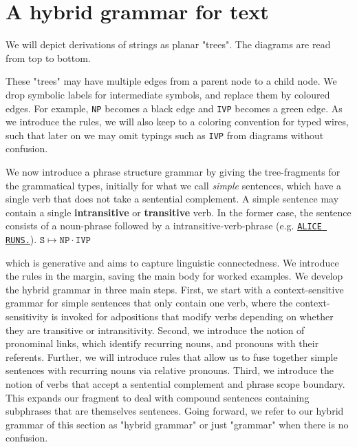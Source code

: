 \section{A hybrid grammar for text}\label{sec:grammar}

\begin{marginfigure}
\centering
{}
\caption{We will depict derivations of strings as planar "trees". The diagrams are read from top to bottom.}
\end{marginfigure}

\begin{marginfigure}
\centering
{}
\caption{These "trees" may have multiple edges from a parent node to a child node. We drop symbolic labels for intermediate symbols, and replace them by coloured edges. For example, \texttt{NP} becomes a black edge and \texttt{IVP} becomes a green edge. As we introduce the rules, we will also keep to a coloring convention for typed wires, such that later on we may omit typings such as \texttt{IVP} from diagrams without confusion.}
\end{marginfigure}

\begin{marginfigure}
\centering
{}
\caption{We now introduce a phrase structure grammar by giving the tree-fragments for the grammatical types, initially for what we call \emph{simple} sentences, which have a single verb that does not take a sentential complement. A simple sentence may contain a single \textbf{intransitive} or \textbf{transitive} verb. In the former case, the sentence consists of a noun-phrase followed by a intransitive-verb-phrase (e.g. \texttt{\underline{ALICE RUNS.}}). $\texttt{S} \mapsto \texttt{NP} \cdot \texttt{IVP}$}
\end{marginfigure}

 which is generative and aims to capture linguistic connectedness. We introduce the rules in the margin, saving the main body for worked examples. We develop the hybrid grammar in three main steps. First, we start with a context-sensitive grammar for simple sentences that only contain one verb, where the context-sensitivity is invoked for adpositions that modify verbs depending on whether they are transitive or intransitivity. Second, we introduce the notion of pronominal links, which identify recurring nouns, and pronouns with their referents. Further, we will introduce rules that allow us to fuse together simple sentences with recurring nouns via relative pronouns. Third, we introduce the notion of verbs that accept a sentential complement and phrase scope boundary. This expands our fragment to deal with compound sentences containing subphrases that are themselves sentences. Going forward, we refer to our hybrid grammar of this section as "hybrid grammar" or just "grammar" when there is no confusion.

